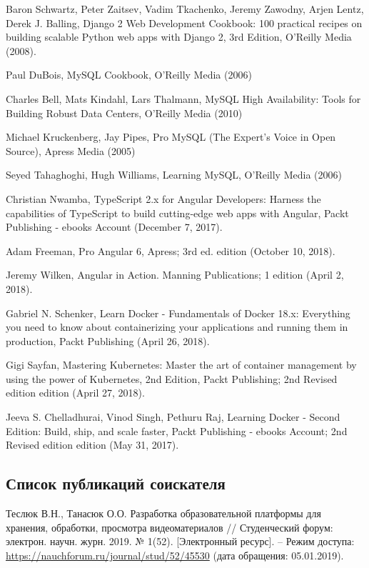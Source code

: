 \begin{thebibliography}{}
\bibitem{}
  Baron Schwartz, Peter Zaitsev, Vadim Tkachenko, Jeremy Zawodny, Arjen Lentz, Derek J. Balling,
  Django 2 Web Development Cookbook: 100 practical recipes on building scalable Python web apps with Django 2, 3rd Edition,
  O'Reilly Media (2008).


\bibitem{}
  Paul DuBois,
  MySQL Cookbook,
  O'Reilly Media (2006)

\bibitem{}
  Charles Bell, Mats Kindahl, Lars Thalmann,
  MySQL High Availability: Tools for Building Robust Data Centers,
  O'Reilly Media (2010)

\bibitem{}
  Michael Kruckenberg, Jay Pipes,
  Pro MySQL (The Expert's Voice in Open Source),
  Apress Media (2005)

\bibitem{}
  Seyed Tahaghoghi, Hugh Williams,
  Learning MySQL,
  O'Reilly Media (2006)

  Christian Nwamba,
  TypeScript 2.x for Angular Developers: Harness the capabilities of TypeScript to build cutting-edge web apps with Angular,
  Packt Publishing - ebooks Account (December 7, 2017).

  Adam Freeman,
  Pro Angular 6,
  Apress; 3rd ed. edition (October 10, 2018).

  Jeremy Wilken,
  Angular in Action.
  Manning Publications; 1 edition (April 2, 2018).

  Gabriel N. Schenker,
  Learn Docker - Fundamentals of Docker 18.x: Everything you need to know about containerizing your applications and running them in production,
  Packt Publishing (April 26, 2018).

  Gigi Sayfan,
  Mastering Kubernetes: Master the art of container management by using the power of Kubernetes, 2nd Edition,
  Packt Publishing; 2nd Revised edition edition (April 27, 2018).

  Jeeva S. Chelladhurai, Vinod Singh, Pethuru Raj,
  Learning Docker - Second Edition: Build, ship, and scale faster,
  Packt Publishing - ebooks Account; 2nd Revised edition edition (May 31, 2017).

\end{thebibliography}

\subsection*{Список публикаций соискателя}

\begin{thebibliography}{}

\bibitem{}
  Теслюк В.Н., Танасюк О.О.
  Разработка образовательной платформы для хранения, обработки, просмотра видеоматериалов
  // Студенческий форум: электрон. научн. журн. 2019. № 1(52).
  [Электронный ресурс]. – Режим доступа:
  \href{https://nauchforum.ru/journal/stud/52/45530}{https://nauchforum.ru/journal/stud/52/45530}
  (дата обращения: 05.01.2019).

\end{thebibliography}{}

\endgroup